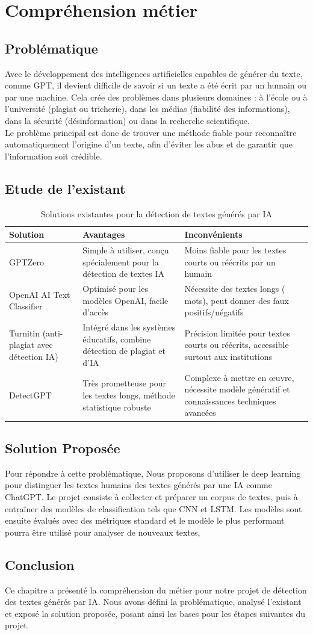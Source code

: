 \chapter{Compréhension métier}

\section{Problématique }
Avec le développement des intelligences artificielles capables de générer du texte, comme GPT, il devient difficile de savoir si un texte a été écrit par un humain ou par une machine. Cela crée des problèmes dans plusieurs domaines : à l’école ou à l’université (plagiat ou tricherie), dans les médias (fiabilité des informations), dans la sécurité (désinformation) ou dans la recherche scientifique.
\\
Le problème principal est donc de trouver une méthode fiable pour reconnaître automatiquement l’origine d’un texte, afin d’éviter les abus et de garantir que l’information soit crédible.
\section{Etude de l'existant}
\begin{table}[h!]
\centering
\begin{tabular}{|p{5cm}|p{5cm}|p{5cm}|}
\hline
\textbf{Solution} & \textbf{Avantages} & \textbf{Inconvénients} \\
\hline
GPTZero & Simple à utiliser, conçu spécialement pour la détection de textes IA & Moins fiable pour les textes courts ou réécrits par un humain \\
\hline
OpenAI AI Text Classifier & Optimisé pour les modèles OpenAI, facile d’accès & Nécessite des textes longs (\>150 mots), peut donner des faux positifs/négatifs \\
\hline
Turnitin (anti-plagiat avec détection IA) & Intégré dans les systèmes éducatifs, combine détection de plagiat et d’IA & Précision limitée pour textes courts ou réécrits, accessible surtout aux institutions \\
\hline
DetectGPT & Très prometteuse pour les textes longs, méthode statistique robuste & Complexe à mettre en œuvre, nécessite modèle génératif et connaissances techniques avancées \\
\hline
\end{tabular}
\caption{Solutions existantes pour la détection de textes générés par IA}
\end{table}
\section{Solution Proposée}
Pour répondre à cette problématique, Nous proposons d’utiliser le deep learning pour distinguer les textes humains des textes générés par une IA comme ChatGPT. Le projet consiste à collecter et préparer un corpus de textes, puis à entraîner des modèles de classification tels que CNN et LSTM. Les modèles sont ensuite évalués avec des métriques standard et le modèle le plus performant pourra être utilisé pour analyser de nouveaux textes,
\section{Conclusion}
Ce chapitre a présenté la compréhension du métier pour notre projet de détection des textes générés par IA. Nous avons défini la problématique, analysé l’existant et exposé la solution proposée, posant ainsi les bases pour les étapes suivantes du projet.